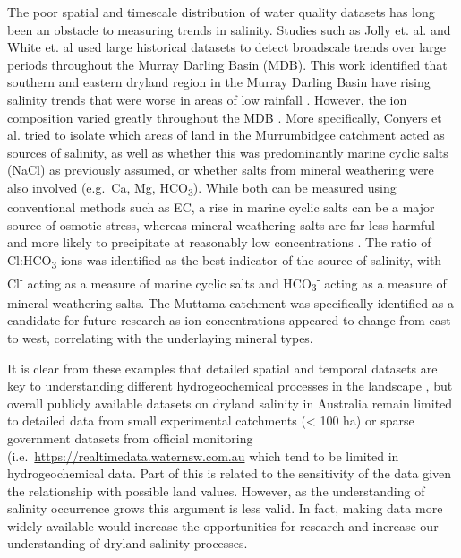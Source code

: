 \documentclass[, manuscript]{copernicus}
\begin{document}
The poor spatial and timescale distribution of water quality datasets
has long been an obstacle to measuring trends in salinity. Studies such
as Jolly et. al. \citeyearpar{Jolly2001} and White et. al
\citeyearpar{White2009} used large historical datasets to detect
broadscale trends over large periods throughout the Murray Darling Basin
(MDB). This work identified that southern and eastern dryland region in
the Murray Darling Basin have rising salinity trends that were worse in
areas of low rainfall \citep{White2009, Jolly2001}. However, the ion
composition varied greatly throughout the MDB \citep{White2009}. More
specifically, Conyers et al. \citeyearpar{Conyers2008} tried to isolate
which areas of land in the Murrumbidgee catchment acted as sources of
salinity, as well as whether this was predominantly marine cyclic salts
(NaCl) as previously assumed, or whether salts from mineral weathering
were also involved (e.g.~Ca, Mg, HCO\textsubscript{3}). While both can
be measured using conventional methods such as EC, a rise in marine
cyclic salts can be a major source of osmotic stress, whereas mineral
weathering salts are far less harmful and more likely to precipitate at
reasonably low concentrations \citep{Conyers2008}. The ratio of
Cl:HCO\textsubscript{3} ions was identified as the best indicator of the
source of salinity, with Cl\textsuperscript{-} acting as a measure of
marine cyclic salts and HCO\textsubscript{3}\textsuperscript{-} acting
as a measure of mineral weathering salts. The Muttama catchment was
specifically identified as a candidate for future research as ion
concentrations appeared to change from east to west, correlating with
the underlaying mineral types.

It is clear from these examples that detailed spatial and temporal
datasets are key to understanding different hydrogeochemical processes
in the landscape \citep[e.g.][]{Cartwright2010, Dalhaus2010}, but
overall publicly available datasets on dryland salinity in Australia
remain limited to detailed data from small experimental catchments
(\textless{} 100 ha) \citep{Summerell2006, Hughes2007} or sparse
government datasets from official monitoring
(i.e.~\url{https://realtimedata.waternsw.com.au} which tend to be
limited in hydrogeochemical data. Part of this is related to the
sensitivity of the data given the relationship with possible land
values. However, as the understanding of salinity occurrence grows this
argument is less valid. In fact, making data more widely available would
increase the opportunities for research and increase our understanding
of dryland salinity processes.
\end{document}
